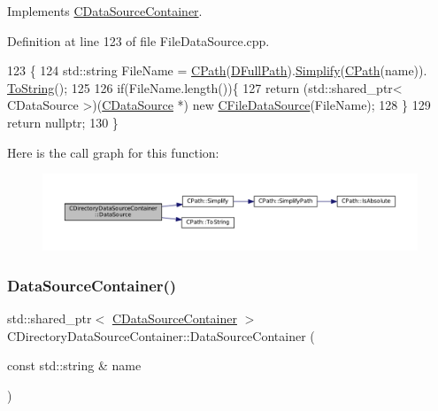 Implements \hyperlink{classCDataSourceContainer_aea214236c4ed2aef231072b909982f7d}{C\+Data\+Source\+Container}.



Definition at line 123 of file File\+Data\+Source.\+cpp.


\begin{DoxyCode}
123                                                                                            \{
124     std::string FileName = \hyperlink{classCPath}{CPath}(\hyperlink{classCDirectoryDataSourceContainer_ac3d3c7e7d7bc9f68ba8a8747a3dee8b5}{DFullPath}).\hyperlink{classCPath_aa52dcb50c943a8abc8883db5ec43a45e}{Simplify}(\hyperlink{classCPath}{CPath}(name)).
      \hyperlink{classCPath_abbafaf377a7e38e0151bd9567d526951}{ToString}();
125     
126     \textcolor{keywordflow}{if}(FileName.length())\{
127         \textcolor{keywordflow}{return} (std::shared\_ptr< CDataSource >)(\hyperlink{classCDataSource}{CDataSource} *) \textcolor{keyword}{new} 
      \hyperlink{classCFileDataSource}{CFileDataSource}(FileName);
128     \}
129     \textcolor{keywordflow}{return} \textcolor{keyword}{nullptr};
130 \}
\end{DoxyCode}
Here is the call graph for this function\+:\nopagebreak
\begin{figure}[H]
\begin{center}
\leavevmode
\includegraphics[width=350pt]{classCDirectoryDataSourceContainer_ac925eec9c2c71654d0012bff92a462d4_cgraph}
\end{center}
\end{figure}
\hypertarget{classCDirectoryDataSourceContainer_a71291ab0a549056fc784f0c553a8dc39}{}\label{classCDirectoryDataSourceContainer_a71291ab0a549056fc784f0c553a8dc39} 
\subsubsection{\texorpdfstring{Data\+Source\+Container()}{DataSourceContainer()}}
{\footnotesize\ttfamily std\+::shared\+\_\+ptr$<$ \hyperlink{classCDataSourceContainer}{C\+Data\+Source\+Container} $>$ C\+Directory\+Data\+Source\+Container\+::\+Data\+Source\+Container (\begin{DoxyParamCaption}\item[{const std\+::string \&}]{name }\end{DoxyParamCaption})\hspace{0.3cm}{\ttfamily [virtual]}}



